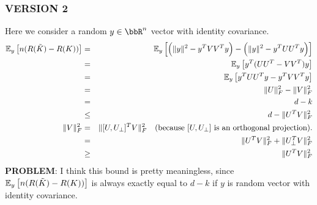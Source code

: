 \subsubsection{VERSION 2}
Here we consider a random $y \in \RR^n$ vector with identity covariance.
\begin{eqnarray*}
	\expect{y}{n(R(\tK) - R(K))} &=& \expect{y}{\Big(\|y\|^2 - y^T VV^T y\Big) - \Big(\|y\|^2 - y^T UU^T y\Big)}\\
	&=& \expect{y}{y^T (UU^T - VV^T) y} \\
	&=& \expect{y}{y^T UU^T y - y^TVV^T y} \\
	&=&  \|U\|_F^2  -  \|V\|_F^2 \\
	&=& d-k \\
	&\leq& d  -  \|U^T V\|_F^2 \\
	\|V\|_F^2 &=& \|[U,U_{\perp}]^T V\|_F^2 \quad \text{(because $[U,U_{\perp}]$ is an orthogonal projection).} \\
	&=& \|U^T V\|_F^2 + \|U_{\perp}^T V\|_F^2 \\
	&\geq& \|U^T V\|_F^2 \\
\end{eqnarray*}
\textbf{PROBLEM}: I think this bound is pretty meaningless, since $\expect{y}{n(R(\tK) - R(K))}$ is always exactly equal to $d-k$ if $y$ is random vector with identity covariance.

